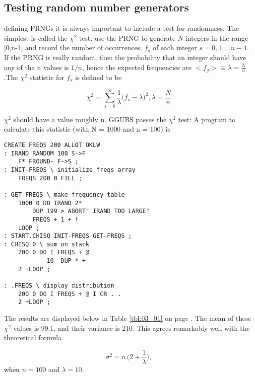 
\subsection{Testing random number generators}
 defining PRNGs it is always important to include a test
for randomness. The simplest is called the $\chi^2$ test: use the
PRNG to generate $N$ integers in the range [0,n-1] and record
the number of occurrences, $f_s$ of each integer $s = 0, 1, \dots n-1$. If
the PRNG is really random, then the probability that an integer
should have any of the $n$ values is $1/n$, hence the expected 
frequencies are $<f_g> \equiv \lambda = \frac{N}{n}$ .The $\chi^2$ statistic for $f_s$ is defined to
be

\begin{equation}
\chi^2=\sum_{s=0}^{\infty}\frac{1}{\lambda}\Big(f_s-\lambda\Big)^2, \lambda=\frac{N}{n} %
\end{equation}


$\chi^2$ should have a value roughly n. GGUBS passes the $\chi^2$ test: A
program to calculate this statistic (with N = 1000 and n = 100) is

\begin{verbatim}
CREATE FREQS 200 ALLOT OKLW
: IRAND RANDOM 100 S->F
    F* FROUND- F->S ;
: INIT-FREQS \ initialize freqs array
    FREQS 200 0 FILL ;

: GET-FREQS \ make frequency table
    1000 0 DO IRAND 2*
        DUP 199 > ABORT" IRAND TOO LARGE"
        FREQS + 1 + !
    LOOP ;
: START.CHISQ INIT-FREQS GET—FREQS ;
: CHISQ 0 \ sum on stack
    200 0 DO I FREQS + @
            10- DUP * +
    2 +LOOP ;

: .FREQS \ display distribution
    200 0 DO I FREQS + @ I CR . . 
    2 +LOOP ;
\end{verbatim}
 


The results are displayed below in Table \ref{tbl:03_01} on page \pageref{tbl:03_01}. The mean
of these $\chi^2$ values is 99.1, and their variance is 210. This agrees
remarkably well with the theoretical formula

\begin{equation*}
    \sigma^2=n \, \Big(2+\frac{1}{\lambda}\Big),
\end{equation*}
when $n = 100$ and $\lambda = 10$.

 
